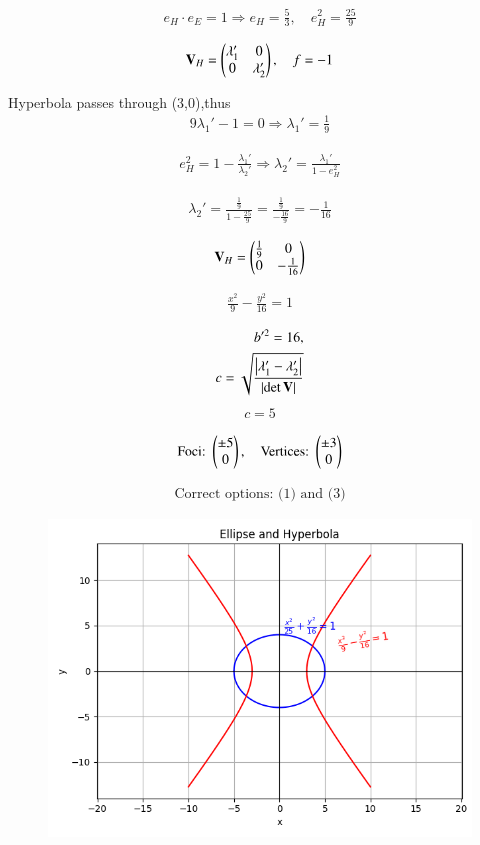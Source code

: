 \documentclass[journal]{IEEEtran}
\begin{document}
\begin{align}
e_H \cdot e_E = 1 \Rightarrow e_H = \frac{5}{3}, \quad e_H^2 = \frac{25}{9}
\end{align}

\begin{align}
\mathbf{V}_H = \begin{pmatrix}\lambda_1' & 0 \\ 0 & \lambda_2'\end{pmatrix}, \quad f = -1
\end{align}

Hyperbola passes through  (3,0),thus
\begin{align}
9\lambda_1' - 1 = 0 \Rightarrow \lambda_1' = \frac{1}{9}
\end{align}

\begin{align}
e_H^2 = 1 - \frac{\lambda_1'}{\lambda_2'} \Rightarrow \lambda_2' = \frac{\lambda_1'}{1 - e_H^2}
\end{align}

\begin{align}
\lambda_2' = \frac{\frac{1}{9}}{1 - \frac{25}{9}} = \frac{\frac{1}{9}}{-\frac{16}{9}} = -\frac{1}{16}
\end{align}

\begin{align}
\mathbf{V}_H = \begin{pmatrix}\frac{1}{9} & 0 \\ 0 & -\frac{1}{16}\end{pmatrix}
\end{align}

\begin{align}
\frac{x^2}{9} - \frac{y^2}{16} = 1
\end{align}

\begin{align}
b'^2 = 16, \\
c = \sqrt{\frac{\left\vert\lambda_1' - \lambda_2'\right\vert}{\left\vert\det{\mathbf{V}}\right\vert}}
\end{align}
\begin{align}
    c=5
\end{align}

\begin{align}
\text{Foci: } \begin{pmatrix}\pm5 \\ 0\end{pmatrix}, \quad \text{Vertices: } \begin{pmatrix}\pm3 \\ 0\end{pmatrix}
\end{align}

\begin{align}
\boxed{\text{Correct options: (1) and (3)}}
\end{align}

\begin{figure}[ht!]
\centering
\includegraphics[height=0.4\textheight, keepaspectratio]{figs/ell.png}
\end{figure}
\end{document}
